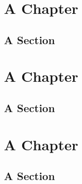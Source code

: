 \documentclass[10pt]{report}
\begin{document}
\chapter{A Chapter}
\blindtext
\section{A Section}
\blindtext
\blindtext
\newline\newline
\blindtext
\blindtext
\blindtext
\blindtext
\newline\newline
\blindtext
\blindtext

\chapter{A Chapter}
\blindtext
\section{A Section}
\blindtext
\blindtext
\newline\newline
\blindtext
\blindtext
\blindtext
\blindtext
\newline\newline
\blindtext
\blindtext

\chapter{A Chapter}
\blindtext
\section{A Section}
\blindtext
\blindtext
\newline\newline
\blindtext
\blindtext
\end{document}
